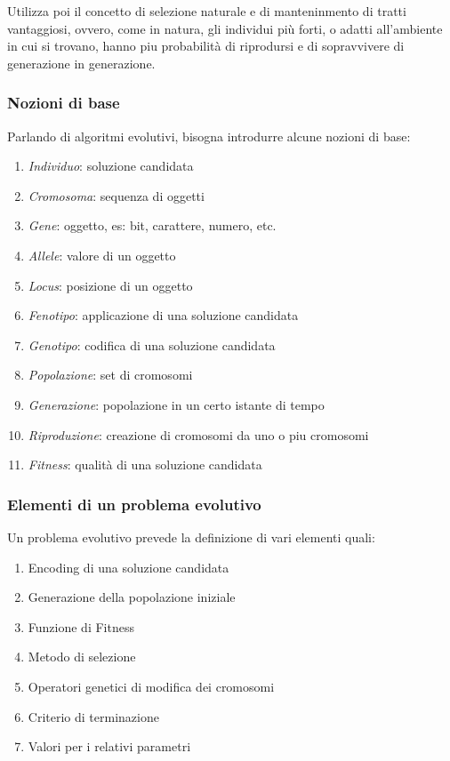 \documentclass[a4paper]{article}
\begin{document}
Utilizza poi il concetto di selezione naturale e di manteninmento di tratti 
vantaggiosi, ovvero, come in natura, gli individui più forti, o adatti all'ambiente 
in cui si trovano, hanno piu probabilità di riprodursi e di sopravvivere di generazione 
in generazione.

\subsubsection{Nozioni di base}
Parlando di algoritmi evolutivi, bisogna introdurre alcune nozioni di base:
\begin{enumerate}
    \item \emph{Individuo}: soluzione candidata
    \item \emph{Cromosoma}: sequenza di oggetti
    \item \emph{Gene}: oggetto, es: bit, carattere, numero, etc.
    \item \emph{Allele}: valore di un oggetto
    \item \emph{Locus}: posizione di un oggetto
    \item \emph{Fenotipo}: applicazione di una soluzione candidata
    \item \emph{Genotipo}: codifica di una soluzione candidata
    \item \emph{Popolazione}: set di cromosomi
    \item \emph{Generazione}: popolazione in un certo istante di tempo
    \item \emph{Riproduzione}: creazione di cromosomi da uno o piu cromosomi
    \item \emph{Fitness}: qualità di una soluzione candidata
\end{enumerate}

\subsubsection{Elementi di un problema evolutivo}
Un problema evolutivo prevede la definizione di vari elementi quali:
\begin{enumerate}
    \item Encoding di una soluzione candidata
    \item Generazione della popolazione iniziale
    \item Funzione di Fitness
    \item Metodo di selezione
    \item Operatori genetici di modifica dei cromosomi
    \item Criterio di terminazione
    \item Valori per i relativi parametri
\end{enumerate}
\end{document}
